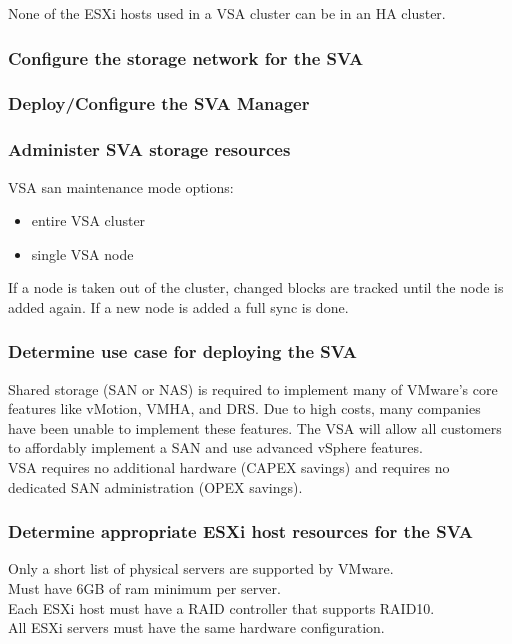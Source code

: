 None of the ESXi hosts used in a VSA cluster can be in an HA cluster.

\subsubsection{Configure the storage network for the SVA}

\subsubsection{Deploy/Configure the SVA Manager}

\subsubsection{Administer SVA storage resources}

VSA san maintenance mode options:

\begin{itemize}
\item entire VSA cluster
\item single VSA node
\end{itemize}

If a node is taken out of the cluster, changed blocks are tracked until the
node is added again. If a new node is added a full sync is done.

\subsubsection{Determine use case for deploying the SVA}

Shared storage (SAN or NAS) is required to implement many of VMware's core
features like vMotion, VMHA, and DRS. Due to high costs, many companies have
been unable to implement these features. The VSA will allow all customers to
affordably implement a SAN and use advanced vSphere features.\\

VSA requires no additional hardware (CAPEX savings) and requires no dedicated
SAN administration (OPEX savings).

\subsubsection{Determine appropriate ESXi host resources for the SVA}

Only a short list of physical servers are supported by VMware.\\

Must have 6GB of ram minimum per server.\\

Each ESXi host must have a RAID controller that supports RAID10.\\

All ESXi servers must have the same hardware configuration.\\
